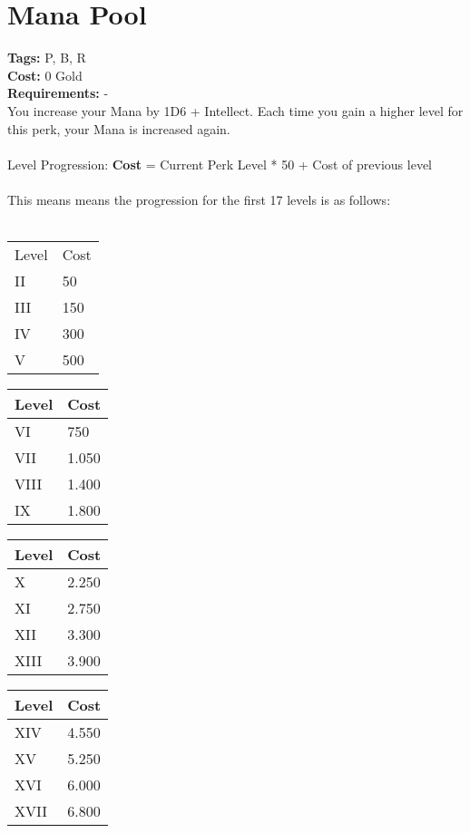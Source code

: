 \section{Mana Pool}\label{sec:manapool}
\textbf{Tags:} P, B, R\\
\textbf{Cost:} 0 Gold\\
\textbf{Requirements:} -\\
You increase your Mana by 1D6 + Intellect.
Each time you gain a higher level for this perk, your Mana is increased again.\\
\\
Level Progression: \textbf{Cost} = Current Perk Level * 50 + Cost of previous level\\
\\
This means means the progression for the first 17 levels is as follows:\\
\\
\begin{minipage}{0.25\textwidth}
    \begin{tabular}{l | l}
        Level & Cost\\
        II & 50\\
        III & 150\\
        IV & 300\\
        V & 500\\
    \end{tabular}
\end{minipage}
\begin{minipage}{0.25\textwidth}
    \begin{tabular}{l | l}
        Level & Cost\\ \hline
        VI & 750\\
        VII & 1.050\\
        VIII & 1.400\\
        IX & 1.800\\
    \end{tabular}
\end{minipage}
\begin{minipage}{0.25\textwidth}
    \begin{tabular}{l | l}
        Level & Cost\\ \hline
        X & 2.250\\
        XI & 2.750\\
        XII & 3.300\\
        XIII & 3.900\\
    \end{tabular}
\end{minipage}
\begin{minipage}{0.25\textwidth}
    \begin{tabular}{l | l}
        Level & Cost\\ \hline
        XIV & 4.550\\
        XV & 5.250\\
        XVI & 6.000\\
        XVII & 6.800\\
    \end{tabular}
\end{minipage}

